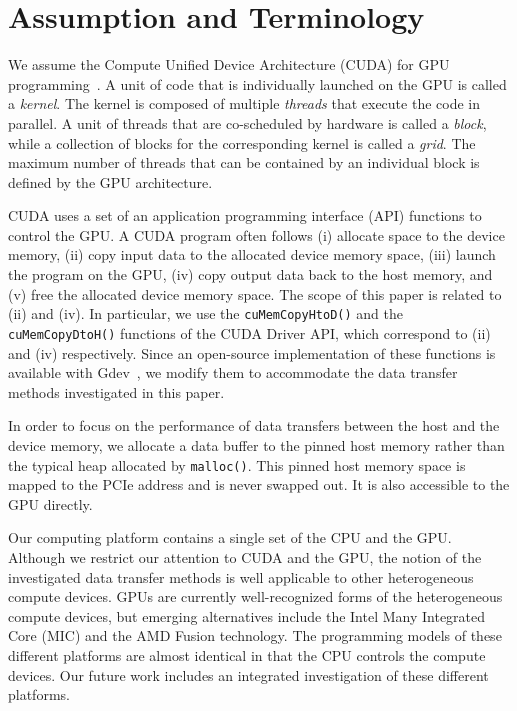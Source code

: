 \section{Assumption and Terminology}
\label{sec:assumption}

We assume the Compute Unified Device Architecture (CUDA) for GPU
programming~\cite{NVIDIA_CUDA}.
A unit of code that is individually launched on the GPU is called
a \textit{kernel}.
The kernel is composed of multiple \textit{threads} that execute the
code in parallel.
A unit of threads that are co-scheduled by hardware is called a
\textit{block}, while a collection of blocks for the corresponding
kernel is called a \textit{grid}.  
The maximum number of threads that can be contained by an individual
block is defined by the GPU architecture.

CUDA uses a set of an application programming interface (API) functions
to control the GPU.
A CUDA program often follows (i) allocate space
to the device memory, (ii) copy input data to the allocated device memory
space, (iii) launch the program on the GPU, (iv) copy output data back
to the host memory, and (v) free the allocated device memory space. 
The scope of this paper is related to (ii) and (iv).
In particular, we use the \texttt{cuMemCopyHtoD()} and the
\texttt{cuMemCopyDtoH()} functions of the CUDA Driver API, which
correspond to (ii) and (iv) respectively.
Since an open-source implementation of these functions is available with
Gdev~\cite{Kato_ATC12}, we modify them to accommodate the data transfer
methods investigated in this paper.

In order to focus on the performance of data transfers between the host
and the device memory, we allocate a data buffer to the pinned host
memory rather than the typical heap allocated by \texttt{malloc()}.
This pinned host memory space is mapped to the PCIe address and is never
swapped out.
It is also accessible to the GPU directly.

Our computing platform contains a single set of the CPU and the GPU.
Although we restrict our attention to CUDA and the GPU, the notion of
the investigated data transfer methods is well applicable to other
heterogeneous compute devices.
GPUs are currently well-recognized forms of the heterogeneous compute
devices, but emerging alternatives include the Intel Many Integrated
Core (MIC) and the AMD Fusion technology.
The programming models of these different platforms are almost identical
in that the CPU controls the compute devices.
Our future work includes an integrated investigation of these different
platforms.
